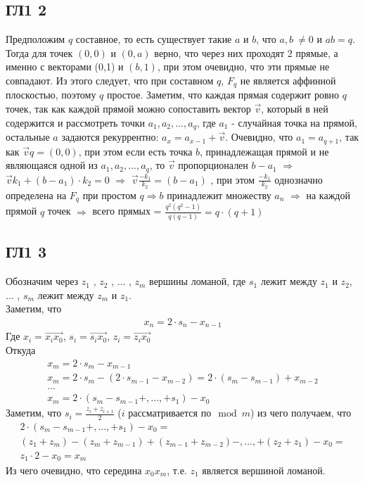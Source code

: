 	\subsection{ГЛ1 2}
		Предположим $q$ составное, то есть существует такие $a$ и $b$, что $a,b \: \ne 0$ и $ab = q$. Тогда для точек $(0,0)$ и $(0,a)$ верно, что через них проходят 2 прямые,
		а именно с векторами (0,1) и $(b, 1)$, при этом очевидно, что эти прямые не совпадают. Из этого следует, что при составном $q$, $F_q$ не является аффинной плоскостью, поэтому $q$ простое.
		Заметим, что каждая прямая содержит ровно $q$ точек, так как каждой прямой можно сопоставить вектор $\overrightarrow{v}$, который в ней содержится и рассмотреть точки $a_1, a_2 , ... , a_q$, где $a_1$ - случайная точка на прямой, остальные $a$ задаются рекуррентно: $a_x = a_{x-1} + \overrightarrow{v}$. Очевидно, что $a_1 = a_{q + 1}$, так как $\overrightarrow{v}q = (0,0)$, при этом если есть точка $b$, принадлежащая прямой и не являющаяся одной из $a_1, a_2 , ... , a_q$, то $\overrightarrow{v}$ пропорционален $b - a_1$ $\Rightarrow$ $\overrightarrow{v}k_1 + (b - a_1) \cdot k_2 = 0$ $\Rightarrow$ $\overrightarrow{v}\frac{-k_1}{k_2} = (b - a_1)$ , при этом $\frac{-k_1}{k_2}$ однозначно определена на $F_q$ при простом $q \Rightarrow b$ принадлежит множеству $a_n$ $\Rightarrow$ на каждой прямой $q$ точек $\Rightarrow$ всего прямых = $\frac{q^2(q^2 - 1)}{q(q-1)} = q \cdot (q + 1)$ 
 
	\subsection{ГЛ1 3}
		Обозначим через $z_1$ , $z_2$ , ... , $z_m$ вершины ломаной, где $s_1$ лежит между $z_1$ и $z_2$, ... , $s_m$ лежит между $z_m$ и $z_1$.\\ 
		Заметим, что
		\begin{gather*}
		x_n = 2 \cdot s_n - x_{n-1}
		\end{gather*}
		Где $x_i = \overrightarrow{x_i x_0}$, $s_i = \overrightarrow{s_i x_0}$, $z_i = \overrightarrow{z_i x_0}$\\
		Откуда
		\begin{gather*}
		x_m = 2 \cdot s_m - x_{m-1}\\
		x_m = 2 \cdot s_m - (2 \cdot s_{m-1} - x_{m-2}) = 2 \cdot (s_m - s_{m-1}) + x_{m-2}\\
		...\\
		x_m = 2 \cdot (s_m - s_{m-1} + , ... , + s_1) - x_0
		\end{gather*}
		Заметим, что $s_i = \frac{z_i + z_{i + 1}}{2}$ ($i$ рассматривается по$\mod m$) из чего получаем, что
		\begin{gather*}
		2 \cdot (s_m - s_{m-1} + , ... , + s_1) - x_0 =\\
		(z_1 + z_m) - (z_m + z_{m-1}) + (z_{m-1} + z_{m-2}) - , ... , + (z_2 + z_1) - x_0 =\\
		z_1 \cdot 2 - x_0 = x_m
		\end{gather*}
		Из чего очевидно, что середина $x_0x_m$, т.е. $z_1$ является вершиной ломаной.\\
		

